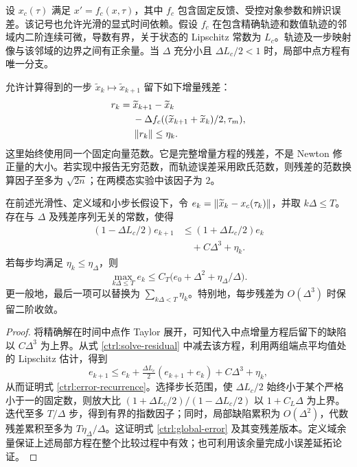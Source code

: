 设 $x_c(\tau)$ 满足 $x'=f_c(x,\tau)$，其中 $f_c$ 包含固定反馈、受控对象参数和辨识误差。该记号也允许光滑的显式时间依赖。假设 $f_c$ 在包含精确轨迹和数值轨迹的邻域内二阶连续可微，导数有界，关于状态的 Lipschitz 常数为 $L_c$。轨迹及一步映射像与该邻域的边界之间有正余量。当 $\Delta$ 充分小且 $\Delta L_c/2<1$ 时，局部中点方程有唯一分支。

允许计算得到的一步 $\widetilde x_k\mapsto\widetilde x_{k+1}$ 留下如下增量残差：
\begin{equation}\label{ctrl:solve-residual}
\begin{aligned}
 r_k={}&\widetilde x_{k+1}-\widetilde x_k\\
       &-\Delta f_c((\widetilde x_{k+1}+\widetilde x_k)/2,\tau_m),\\
 &\left\lVert r_k\right\rVert\le\eta_k.
\end{aligned}
\end{equation}
这里始终使用同一个固定向量范数。它是完整增量方程的残差，不是 Newton 修正量的大小。若实现中报告无穷范数，而轨迹误差采用欧氏范数，则残差的范数换算因子至多为 $\sqrt{2n}$；在两模态实验中该因子为 $2$。

\begin{proposition}[包含求解残差的有限时间收敛]
\label{ctrl:convergence}
在前述光滑性、定义域和小步长假设下，令
$e_k=\left\lVert\widetilde x_k-x_c(\tau_k)\right\rVert$，并取 $k\Delta\le T$。存在与 $\Delta$ 及残差序列无关的常数，使得
\begin{equation}\label{ctrl:error-recurrence}
\begin{aligned}
 (1-\Delta L_c/2)e_{k+1}
 &\le(1+\Delta L_c/2)e_k\\
 &\quad+C\Delta^3+\eta_k.
\end{aligned}
\end{equation}
若每步均满足 $\eta_k\le\eta_\Delta$，则
\begin{equation}\label{ctrl:global-error}
 \max_{k\Delta\le T}e_k
 \le C_T\bigl(e_0+\Delta^2+\eta_\Delta/\Delta\bigr).
\end{equation}
更一般地，最后一项可以替换为
$\sum_{k\Delta<T}\eta_k$。特别地，每步残差为
$O(\Delta^3)$ 时保留二阶收敛。
\end{proposition}

\begin{proof}
将精确解在时间中点作 Taylor 展开，可知代入中点增量方程后留下的缺陷以 $C\Delta^3$ 为上界。从式 \eqref{ctrl:solve-residual} 中减去该方程，利用两组端点平均值处的 Lipschitz 估计，得到
\[
 e_{k+1}\le e_k+\tfrac{\Delta L_c}{2}(e_{k+1}+e_k)
                              +C\Delta^3+\eta_k,
\]
从而证明式 \eqref{ctrl:error-recurrence}。选择步长范围，使 $\Delta L_c/2$ 始终小于某个严格小于一的固定数，则放大比
$(1+\Delta L_c/2)/(1-\Delta L_c/2)$ 以 $1+C_L\Delta$ 为上界。迭代至多 $T/\Delta$ 步，得到有界的指数因子；同时，局部缺陷累积为 $O(\Delta^2)$，代数残差累积至多为 $T\eta_\Delta/\Delta$。这证明式 \eqref{ctrl:global-error} 及其变残差版本。定义域余量保证上述局部方程在整个比较过程中有效；也可利用该余量完成小误差延拓论证。
\end{proof}

